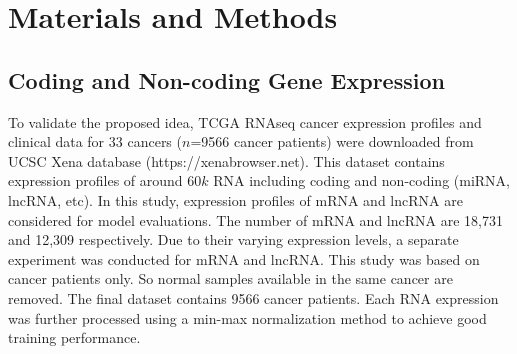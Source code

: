 \documentclass{bioinfo}
\begin{document}
\section{Materials and Methods}
\subsection{Coding and Non-coding Gene Expression}
To validate the proposed idea, TCGA RNAseq cancer expression profiles and clinical data for $33$ cancers ($n$=9566 cancer patients) were downloaded from UCSC Xena database (https://xenabrowser.net). 
This dataset contains expression profiles of around $60k$ RNA including coding and non-coding (miRNA, lncRNA, etc). In this study, expression profiles of mRNA and lncRNA are considered for model evaluations. The number of mRNA and lncRNA are 18,731 and 12,309 respectively. Due to their varying expression levels, a separate experiment was conducted for mRNA and lncRNA. This study was based on cancer patients only. So normal samples available in the same cancer are removed. The final dataset contains 9566 cancer patients. Each RNA expression was further processed using a min-max normalization method to achieve good training performance. 
\end{document}
